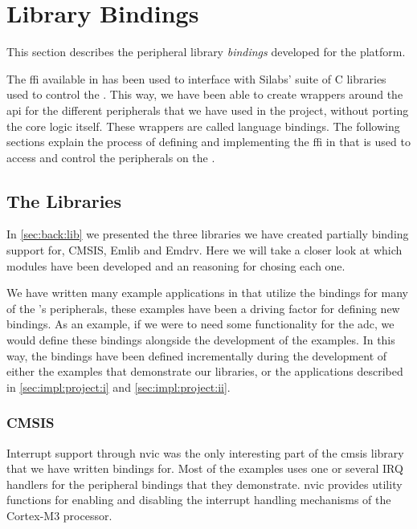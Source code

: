 
\section{Library Bindings}
\label{sub:interfacing_with_emlib}

This section describes the peripheral library \emph{bindings} developed for the platform.

The \gls{ffi} available in {\rust} has been used to interface with Silabs' suite of C libraries used to control the {\gecko}.
This way, we have been able to create wrappers around the \gls{api} for the different peripherals that we have used in the project, without porting the core logic itself.
These wrappers are called language bindings.
The following sections explain the process of defining and implementing the \gls{ffi} in {\rust} that is used to access and control the peripherals on the {\gecko}.

\subsection{The Libraries}
\label{ssub:the_bindings_library}

In \autoref{sec:back:lib} we presented the three libraries we have created partially binding support for, CMSIS, Emlib and Emdrv.
Here we will take a closer look at which modules have been developed and an reasoning for chosing each one.

We have written many example applications in {\rust} that utilize the bindings for many of the {\gecko}'s peripherals, these examples have been a driving factor for defining new bindings.
As an example, if we were to need some functionality for the \gls{adc}, we would define these bindings alongside the development of the examples.
In this way, the bindings have been defined incrementally during the development of either the examples that demonstrate our libraries, or the applications described in \autoref{sec:impl:project:i} and \autoref{sec:impl:project:ii}.

\subsubsection{CMSIS}
\label{sub:cmsis_bindings}

Interrupt support through \gls{nvic} was the only interesting part of the \gls{cmsis} library that we have written bindings for.
Most of the examples uses one or several IRQ handlers for the peripheral bindings that they demonstrate.
\gls{nvic} provides utility functions for enabling and disabling the interrupt handling mechanisms of the Cortex-M3 processor.

